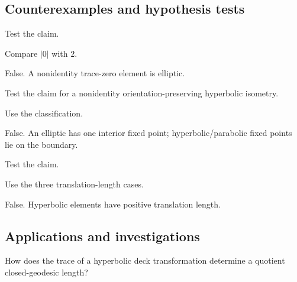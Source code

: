 \subsection*{Counterexamples and hypothesis tests}

\begin{exercise}\label{exr:vii34-ped-10}
Test the claim.
\end{exercise}

\begin{hint}
Compare \(|0|\) with \(2\).
\end{hint}

\begin{solution}
False.  A nonidentity trace-zero element is elliptic.
\end{solution}

\begin{exercise}\label{exr:vii34-ped-11}
Test the claim for a nonidentity orientation-preserving hyperbolic isometry.
\end{exercise}

\begin{hint}
Use the classification.
\end{hint}

\begin{solution}
False.  An elliptic has one interior fixed point; hyperbolic/parabolic fixed points lie on the boundary.
\end{solution}

\begin{exercise}\label{exr:vii34-ped-12}
Test the claim.
\end{exercise}

\begin{hint}
Use the three translation-length cases.
\end{hint}

\begin{solution}
False.  Hyperbolic elements have positive translation length.
\end{solution}

\subsection*{Applications and investigations}

\begin{exercise}\label{exr:vii34-ped-13}
How does the trace of a hyperbolic deck transformation determine a quotient closed-geodesic length?
\end{exercise}

